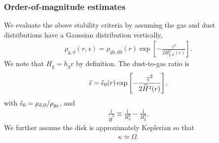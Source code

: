 



\subsubsection{Order-of-magnitude estimates}
We evaluate the above stability criteria by assuming the gas and dust
distributions have a Gaussian 
distribution vertically, 
\begin{align}
  \rho_\mathrm{g,d}(r,z) = \rho_\mathrm{g0,d0}(r) \exp
      {\left[-\frac{z^2}{2H^2_\mathrm{g,d}(r)}\right]}.
\end{align}
We note that $H_\mathrm{g}=h_gr$ by definition. The dust-to-gas ratio
is  
\begin{align}
  \tilde{\epsilon} = \tilde{\epsilon}_0(r)
  \exp{\left[-\frac{z^2}{2\widetilde{H}^2(r)}\right]}, 
\end{align}
with $\tilde{\epsilon}_0= \rho_\mathrm{d,0}/\rho_{g_0}$, and  
\begin{align}
  \frac{1}{\widetilde{H}^2} \equiv \frac{1}{H_\mathrm{d}^2} -
  \frac{1}{H_\mathrm{g}^2}. 
\end{align}
We further assume the disk is approximately Keplerian so that
\begin{align}
  \kappa \simeq \Omega. 
\end{align}
